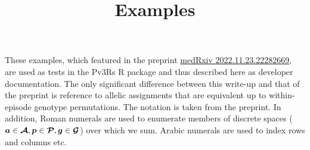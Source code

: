 \documentclass{article}
\title{Examples}
\date{}
\author{}
\begin{document}
\maketitle

These examples, which featured in the preprint
\href{https://doi.org/10.1101/2022.11.23.22282669}{medRxiv 2022.11.23.22282669},
are used as tests in the Pv3Rs R package and thus described here as developer documentation.
The only significant difference between this write-up and that of the preprint is reference to
allelic assignments that are equivalent up to within-episode genotype permutations.
The notation is taken from the preprint. In addition, Roman numerals are used to
enumerate members of discrete spaces ($\bm{a}\in\bm{\mathcal{A}}, \bm{p}\in\bm{\mathcal{P}},\bm{g}\in\bm{\mathcal{G}}$) over
which we sum. Arabic numerals are used to index rows and columns etc.
\end{document}
